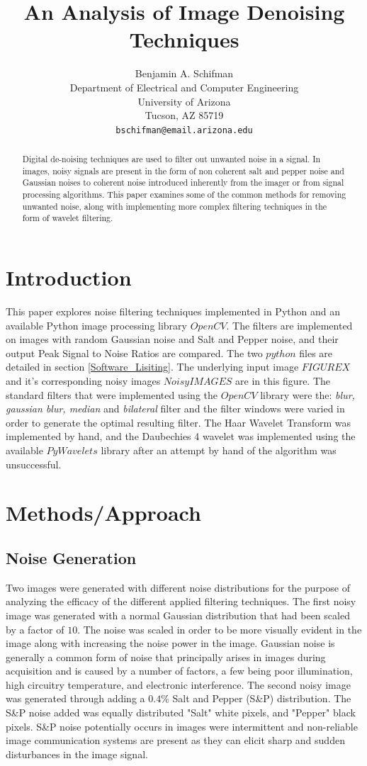\documentclass{article}
\title{An Analysis of Image Denoising Techniques}
\author{
  Benjamin A. Schifman\\
  Department of Electrical and Computer Engineering\\
  University of Arizona\\
  Tucson, AZ 85719 \\
  \texttt{bschifman@email.arizona.edu} \\
}
\begin{document}
 

\maketitle

\begin{abstract}
  Digital de-noising techniques are used to filter out unwanted noise in a signal. In images, noisy signals are present in the form of non coherent salt and pepper noise and Gaussian noises to coherent noise introduced inherently from the imager or from signal processing algorithms. This paper examines some of the common methods for removing unwanted noise, along with implementing more complex filtering techniques in the form of wavelet filtering. 
\end{abstract}

\section{Introduction}
 This paper explores noise filtering techniques implemented in Python and an available Python image processing library $OpenCV.$ The filters are implemented on images with random Gaussian noise and Salt and Pepper noise, and their output Peak Signal to Noise Ratios are compared. The two $python$ files are detailed in section \ref{Software_Lisiting}. The underlying input image $FIGURE X$ and it's corresponding noisy images $Noisy IMAGES$ are in this figure. The standard filters that were implemented using the $OpenCV$ library were the: \textit{blur, gaussian blur, median} and \textit{bilateral} filter and the filter windows were varied in order to generate the optimal resulting filter. The Haar Wavelet Transform was implemented by hand, and the Daubechies 4 wavelet was implemented using the available $PyWavelets$ library after an attempt by hand of the algorithm was unsuccessful.

\section{Methods/Approach}
\subsection{Noise Generation}
Two images were generated with different noise distributions for the purpose of analyzing the efficacy of the different applied filtering techniques. The first noisy image was generated with a normal Gaussian distribution that had been scaled by a factor of $10$. The noise was scaled in order to be more visually evident in the image along with increasing the noise power in the image. Gaussian noise is generally a common form of noise that principally arises in images during acquisition and is caused by a number of factors, a few being poor illumination, high circuitry temperature, and electronic interference. The second noisy image was generated through adding a $0.4\%$ Salt and Pepper (S\&P) distribution. The S\&P noise added was equally distributed "Salt" white pixels, and "Pepper" black pixels. S\&P noise potentially occurs in images were intermittent and non-reliable image communication systems are present as they can elicit sharp and sudden disturbances in the image signal.
\end{document}
